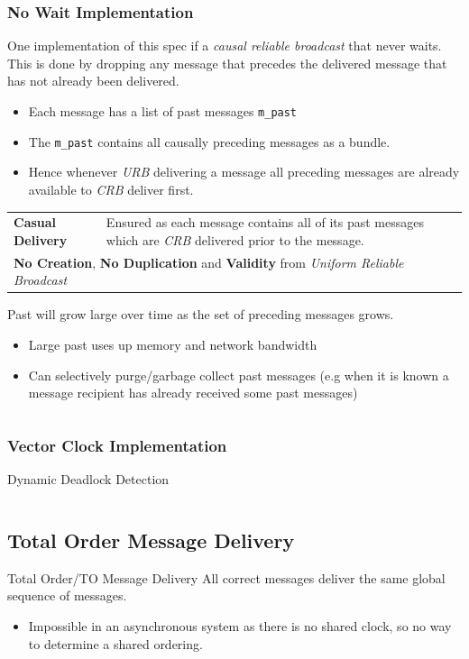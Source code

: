 \subsubsection{No Wait Implementation}
One implementation of this spec if a \textit{causal reliable broadcast} that never waits. This is done by dropping any message that precedes the delivered message that has not already been delivered.
\begin{itemize}
    \item Each message has a list of past messages \texttt{m_past}
    \item The \texttt{m_past} contains all causally preceding messages as a bundle.
    \item Hence whenever \textit{URB} delivering a message all preceding messages are already available to \textit{CRB} deliver first.
\end{itemize}
\begin{center}
    \begin{tabular}{l p{}}
        \textbf{Casual Delivery} & Ensured as each message contains all of its past messages which are \textit{CRB} delivered prior to the message. \\
        \multicolumn{2}{l}{\textbf{No Creation}, \textbf{No Duplication} and \textbf{Validity} from \textit{Uniform Reliable Broadcast}} \\
    \end{tabular}
\end{center}
Past will grow large over time as the set of preceding messages grows.
\begin{itemize}
    \item Large past uses up memory and network bandwidth
    \item Can selectively purge/garbage collect past messages (e.g when it is known a message recipient has already received some past messages)
\end{itemize}
\inputminted{elixir}{broadcast/code/causal_reliable_broadcast_no_wait.ex}

\subsubsection{Vector Clock Implementation}
\begin{sidenotebox}{Dynamic Deadlock Detection}
    \unfinished
\end{sidenotebox}
\unfinished
\inputminted{elixir}{broadcast/code/causal_reliable_broadcast_vector_clock.ex}

\subsection{Total Order Message Delivery}
\begin{definitionbox}{Total Order/TO Message Delivery}
    All correct messages deliver the same global sequence of messages.
    \begin{itemize}
        \item Impossible in an asynchronous system as there is no shared clock, so no way to determine a shared ordering. 
    \end{itemize}
\end{definitionbox}
\unfinished